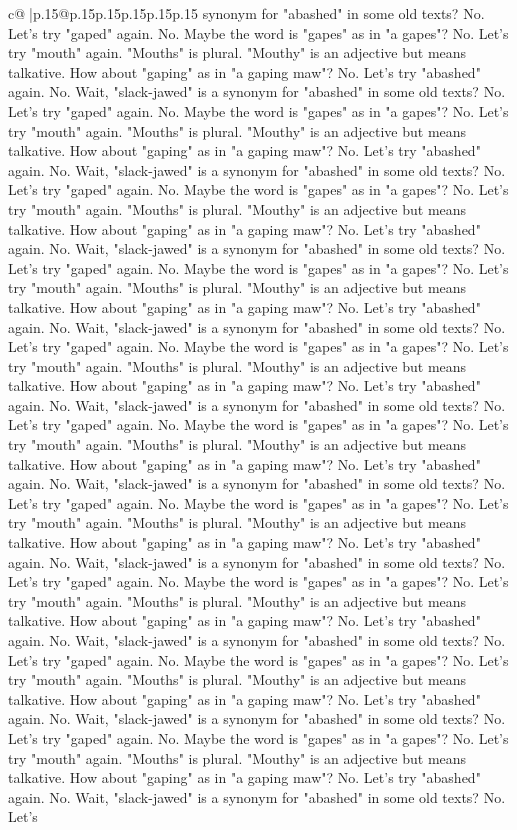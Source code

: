 \documentclass{article}
\begin{document}
{\begin{supertabular}{c@{$\;$}|p{.15\linewidth}@{}p{.15\linewidth}p{.15\linewidth}p{.15\linewidth}p{.15\linewidth}p{.15\linewidth}}
{{{synonym for "abashed" in some old texts? No. Let's try "gaped" again. No. Maybe the word is "gapes" as in "a gapes"? No. Let's try "mouth" again. "Mouths" is plural. "Mouthy" is an adjective but means talkative. How about "gaping" as in "a gaping maw"? No. Let's try "abashed" again. No. Wait, "slack{-}jawed" is a synonym for "abashed" in some old texts? No. Let's try "gaped" again. No. Maybe the word is "gapes" as in "a gapes"? No. Let's try "mouth" again. "Mouths" is plural. "Mouthy" is an adjective but means talkative. How about "gaping" as in "a gaping maw"? No. Let's try "abashed" again. No. Wait, "slack{-}jawed" is a synonym for "abashed" in some old texts? No. Let's try "gaped" again. No. Maybe the word is "gapes" as in "a gapes"? No. Let's try "mouth" again. "Mouths" is plural. "Mouthy" is an adjective but means talkative. How about "gaping" as in "a gaping maw"? No. Let's try "abashed" again. No. Wait, "slack{-}jawed" is a synonym for "abashed" in some old texts? No. Let's try "gaped" again. No. Maybe the word is "gapes" as in "a gapes"? No. Let's try "mouth" again. "Mouths" is plural. "Mouthy" is an adjective but means talkative. How about "gaping" as in "a gaping maw"? No. Let's try "abashed" again. No. Wait, "slack{-}jawed" is a synonym for "abashed" in some old texts? No. Let's try "gaped" again. No. Maybe the word is "gapes" as in "a gapes"? No. Let's try "mouth" again. "Mouths" is plural. "Mouthy" is an adjective but means talkative. How about "gaping" as in "a gaping maw"? No. Let's try "abashed" again. No. Wait, "slack{-}jawed" is a synonym for "abashed" in some old texts? No. Let's try "gaped" again. No. Maybe the word is "gapes" as in "a gapes"? No. Let's try "mouth" again. "Mouths" is plural. "Mouthy" is an adjective but means talkative. How about "gaping" as in "a gaping maw"? No. Let's try "abashed" again. No. Wait, "slack{-}jawed" is a synonym for "abashed" in some old texts? No. Let's try "gaped" again. No. Maybe the word is "gapes" as in "a gapes"? No. Let's try "mouth" again. "Mouths" is plural. "Mouthy" is an adjective but means talkative. How about "gaping" as in "a gaping maw"? No. Let's try "abashed" again. No. Wait, "slack{-}jawed" is a synonym for "abashed" in some old texts? No. Let's try "gaped" again. No. Maybe the word is "gapes" as in "a gapes"? No. Let's try "mouth" again. "Mouths" is plural. "Mouthy" is an adjective but means talkative. How about "gaping" as in "a gaping maw"? No. Let's try "abashed" again. No. Wait, "slack{-}jawed" is a synonym for "abashed" in some old texts? No. Let's try "gaped" again. No. Maybe the word is "gapes" as in "a gapes"? No. Let's try "mouth" again. "Mouths" is plural. "Mouthy" is an adjective but means talkative. How about "gaping" as in "a gaping maw"? No. Let's try "abashed" again. No. Wait, "slack{-}jawed" is a synonym for "abashed" in some old texts? No. Let's try "gaped" again. No. Maybe the word is "gapes" as in "a gapes"? No. Let's try "mouth" again. "Mouths" is plural. "Mouthy" is an adjective but means talkative. How about "gaping" as in "a gaping maw"? No. Let's try "abashed" again. No. Wait, "slack{-}jawed" is a synonym for "abashed" in some old texts? No. Let's }}}
\end{supertabular}}
\end{document}
